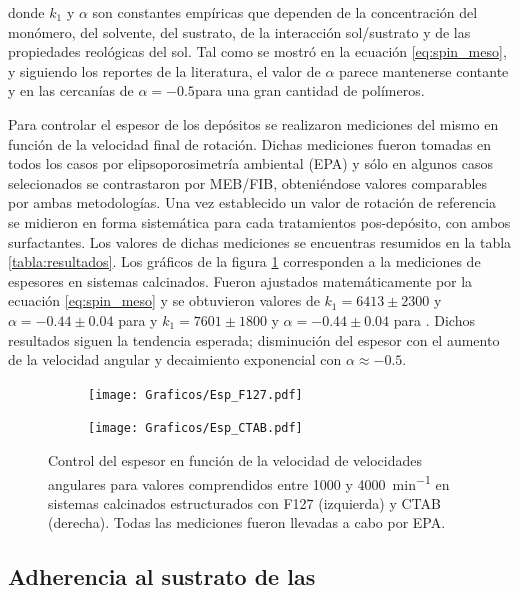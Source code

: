 		donde $k_1$ y $\alpha$ son constantes empíricas que dependen de la concentración del monómero, del solvente, del sustrato, de la interacción sol/sustrato y  de las propiedades reológicas del sol. Tal como se mostró en la ecuación \ref{eq:spin_meso}, y siguiendo los reportes de la literatura, el valor de $\alpha$ parece mantenerse contante y en las cercanías de $\alpha=-0.5$para una gran cantidad de polímeros. 

		Para controlar el espesor de los depósitos se realizaron mediciones del mismo en función de la velocidad final de rotación.  Dichas mediciones fueron tomadas en todos los casos por elipsoporosimetría ambiental (EPA) y sólo en algunos casos selecionados se contrastaron por MEB/FIB, obteniéndose valores comparables por ambas metodologías. Una vez establecido un valor de rotación de referencia se midieron en forma sistemática para cada tratamientos pos-depósito, con ambos surfactantes. Los valores de dichas mediciones se encuentras resumidos en la tabla \ref{tabla:resultados}.
		Los gráficos de la figura \ref{fig:esp} corresponden a la mediciones de espesores en sistemas calcinados. Fueron ajustados matemáticamente por la ecuación \ref{eq:spin_meso} y se obtuvieron valores de $k_1=6413\pm 2300$ y $\alpha=-0.44 \pm 0.04$ para \pdmF\space y $k_1=7601\pm 1800$ y $\alpha=-0.44 \pm 0.04$ para \pdmC. Dichos resultados siguen la tendencia esperada; disminución del espesor con el aumento de la velocidad angular y decaimiento exponencial con $\alpha \approx -0.5$. 

		
			\begin{figure}[!ht]
				\begin{subfigure}[t]{0.495\textwidth}
				\texttt{[image: Graficos/Esp\_F127.pdf]}
				\end{subfigure}
				\begin{subfigure}[t]{0.495\textwidth}
				\texttt{[image: Graficos/Esp\_CTAB.pdf]}
				\end{subfigure}
				\caption[Espesor en función de la velocidad angular]{Control del espesor en función de la velocidad de velocidades angulares para valores comprendidos entre 1000 y \SI{4000}{\minute^{-1}} en sistemas calcinados estructurados con F127 (izquierda) y CTAB (derecha). Todas las mediciones fueron llevadas a cabo por EPA.}
				\label{fig:esp}		
				\end{figure}
	
	\subsection{Adherencia al sustrato de las \pdm}	

